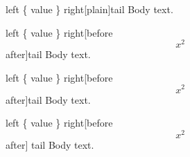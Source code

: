 
\begin{escapedargs}{left \{ value \} right}[plain]{tail}
  Body text.
\end{escapedargs}

\begin{escapedargs}{left \{ value \} right}[before \[
      x^2
    \] after]{tail}
  Body text.
\end{escapedargs}

\begin{escapedargs}{left \{ value \} right}[before \[
      x^2
    \] after]{tail}
  Body text.
\end{escapedargs}

\begin{escapedargs}{left \{ value \} right}[before \[
      x^2
    \] after]%
  {tail}
  Body text.
\end{escapedargs}
